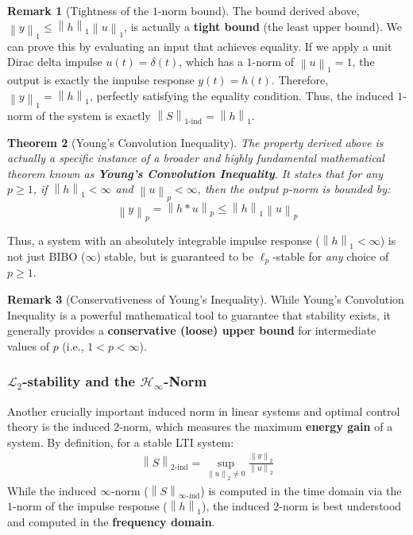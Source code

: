 \documentclass[11pt, a4paper, twoside]{article}
\newcommand{\norm}[1]{\left\lVert#1\right\rVert}
\newcounter{lecnum}
\theoremstyle{plain}
\newtheorem{theorem}{Theorem}[lecnum]
\theoremstyle{definition}
\newtheorem{remark}[theorem]{Remark}
\begin{document}
\begin{remark}[Tightness of the $1$-norm bound]
The bound derived above, $\norm{y}_1 \leq \norm{h}_1 \norm{u}_1$, is actually a \textbf{tight bound} (the least upper bound). We can prove this by evaluating an input that achieves equality. If we apply a unit Dirac delta impulse $u(t) = \delta(t)$, which has a $1$-norm of $\norm{u}_1 = 1$, the output is exactly the impulse response $y(t) = h(t)$. Therefore, $\norm{y}_1 = \norm{h}_1$, perfectly satisfying the equality condition. Thus, the induced $1$-norm of the system is exactly $\norm{S}_{1\text{-ind}} = \norm{h}_1$.
\end{remark}

\begin{theorem}[Young's Convolution Inequality]
The property derived above is actually a specific instance of a broader and highly fundamental mathematical theorem known as \textbf{Young's Convolution Inequality}. It states that for any $p \geq 1$, if $\norm{h}_1 < \infty$ and $\norm{u}_p < \infty$, then the output $p$-norm is bounded by:
$$\norm{y}_p = \norm{h * u}_p \leq \norm{h}_1 \norm{u}_p$$
\end{theorem}

Thus, a system with an absolutely integrable impulse response ($\norm{h}_1 < \infty$) is not just BIBO ($\infty$) stable, but is guaranteed to be $\ell_p$-stable for \textit{any} choice of $p \geq 1$.

\begin{remark}[Conservativeness of Young's Inequality]
While Young's Convolution Inequality is a powerful mathematical tool to guarantee that stability exists, it generally provides a \textbf{conservative (loose) upper bound} for intermediate values of $p$ (i.e., $1 < p < \infty$). 
\end{remark}

\subsubsection*{$\mathcal{L}_2$-stability and the $\mathcal{H}_\infty$-Norm}

Another crucially important induced norm in linear systems and optimal control theory is the induced $2$-norm, which measures the maximum \textbf{energy gain} of a system. By definition, for a stable LTI system:
%
\begin{align*}
    \norm{S}_{2\text{-ind}} = \sup_{\norm{u}_2 \neq 0} \frac{\norm{y}_2}{\norm{u}_2}
\end{align*}
%
While the induced $\infty$-norm ($\norm{S}_{\infty\text{-ind}}$) is computed in the time domain via the $1$-norm of the impulse response ($\norm{h}_1$), the induced $2$-norm is best understood and computed in the \textbf{frequency domain}. 
\end{document}
